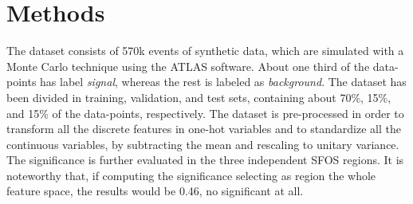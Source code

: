 \documentclass{article}
\begin{document}
\section{Methods}

The dataset consists of 570k events of synthetic data, which are simulated with a Monte Carlo technique using the ATLAS software. About one third of the data-points has label \textit{signal}, whereas the rest is labeled as \textit{background}. The dataset has been divided in training, validation, and test sets, containing about 70\%, 15\%, and 15\% of the data-points, respectively.
The dataset is pre-processed in order to transform all the discrete features in one-hot variables and to standardize all the continuous variables, by subtracting the mean and rescaling to unitary variance.
The significance is further evaluated in the three independent SFOS regions. It is noteworthy that, if computing the significance selecting as region the whole feature space, the results would be 0.46, no significant at all.
\end{document}
